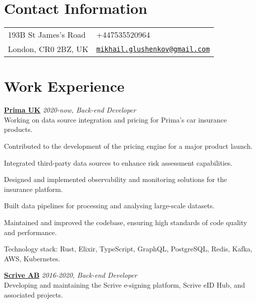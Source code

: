 \documentclass[margin,line]{res}
\begin{document}

\begin{resume}
    \section{\sc Contact Information}
    \vspace{.05in}
    \begin{tabular}{@{}p{2in}p{4in}}
        193B St James's Road &
        +447535520964                           \\
        London, CR0 2BZ, UK  &
        \href{mailto:mikhail.glushenkov@gmail.com}
        {\texttt{mikhail.glushenkov@gmail.com}} \\
    \end{tabular}


    \section{\sc Work Experience}

     {\bf \href{https://helloprima.co.uk}{Prima UK}} \hfill {\it 2020-now, Back-end Developer}\\
    Working on data source integration and pricing for Prima's car insurance products.\\
    \begin{list}{}{\leftmargin=1.5em}
        \item Contributed to the development of the pricing engine for a major product launch.
        \item Integrated third-party data sources to enhance risk assessment capabilities.
        \item Designed and implemented observability and monitoring solutions for the insurance platform.
        \item Built data pipelines for processing and analysing large-scale datasets.
        \item Maintained and improved the codebase, ensuring high standards of code quality and performance.
    \end{list}
    Technology stack: Rust, Elixir, TypeScript, GraphQL, PostgreSQL, Redis, Kafka, AWS, Kubernetes.

        {\bf \href{https://scrive.com}{Scrive AB}} \hfill {\it 2016-2020, Back-end Developer}\\
    Developing and maintaining the Scrive e-signing platform, Scrive eID
    Hub, and associated projects.


\end{resume}
\end{document}
